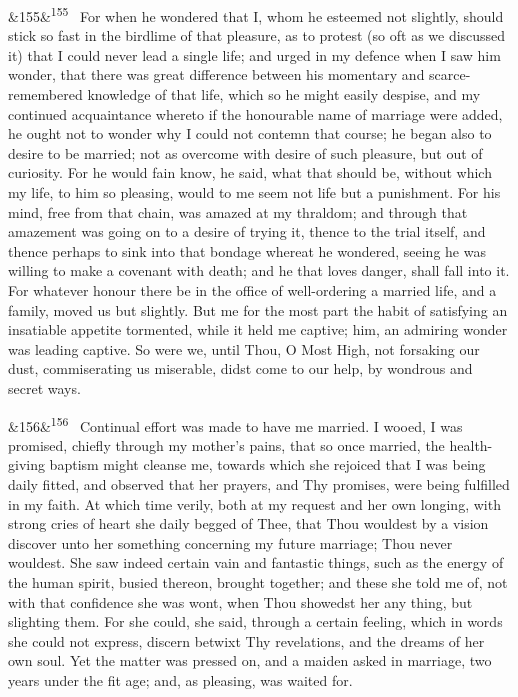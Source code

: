 \documentclass[12pt]{article}
\newcommand{\para}[1][]{\par\noindent\ifx&#1&\else\textsuperscript{\footnotesize #1}~\fi}
\begin{document}
\para[155] For when he wondered that I, whom he esteemed not slightly, should stick so fast in the birdlime of that pleasure, as to protest (so oft as we discussed it) that I could never lead a single life; and urged in my defence when I saw him wonder, that there was great difference between his momentary and scarce-remembered knowledge of that life, which so he might easily despise, and my continued acquaintance whereto if the honourable name of marriage were added, he ought not to wonder why I could not contemn that course; he began also to desire to be married; not as overcome with desire of such pleasure, but out of curiosity. For he would fain know, he said, what that should be, without which my life, to him so pleasing, would to me seem not life but a punishment. For his mind, free from that chain, was amazed at my thraldom; and through that amazement was going on to a desire of trying it, thence to the trial itself, and thence perhaps to sink into that bondage whereat he wondered, seeing he was willing to make a covenant with death; and he that loves danger, shall fall into it. For whatever honour there be in the office of well-ordering a married life, and a family, moved us but slightly. But me for the most part the habit of satisfying an insatiable appetite tormented, while it held me captive; him, an admiring wonder was leading captive. So were we, until Thou, O Most High, not forsaking our dust, commiserating us miserable, didst come to our help, by wondrous and secret ways.

\para[156] Continual effort was made to have me married. I wooed, I was promised, chiefly through my mother's pains, that so once married, the health-giving baptism might cleanse me, towards which she rejoiced that I was being daily fitted, and observed that her prayers, and Thy promises, were being fulfilled in my faith. At which time verily, both at my request and her own longing, with strong cries of heart she daily begged of Thee, that Thou wouldest by a vision discover unto her something concerning my future marriage; Thou never wouldest. She saw indeed certain vain and fantastic things, such as the energy of the human spirit, busied thereon, brought together; and these she told me of, not with that confidence she was wont, when Thou showedst her any thing, but slighting them. For she could, she said, through a certain feeling, which in words she could not express, discern betwixt Thy revelations, and the dreams of her own soul. Yet the matter was pressed on, and a maiden asked in marriage, two years under the fit age; and, as pleasing, was waited for.
\end{document}
